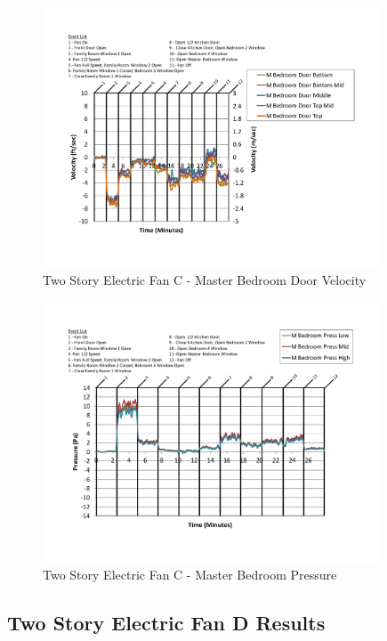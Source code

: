 \documentclass{article}
\begin{document}
\begin{appendices}
	\begin{figure}[H]
		\centering
		\includegraphics[height=3.05in,trim=0.67in 1.1in 0.67in 0.8in,clip=true]{0_Images/Results_Charts/ColdFlow/Two_Story/Electric/C/Master_Bedroom_Door_Velocity.pdf}
		\caption{Two Story Electric Fan C - Master Bedroom Door Velocity}
	\end{figure}
 

	\begin{figure}[H]
		\centering
		\includegraphics[height=3.05in,trim=0.67in 1.1in 0.67in 0.8in,clip=true]{0_Images/Results_Charts/ColdFlow/Two_Story/Electric/C/Master_Bedroom_Pressure.pdf}
		\caption{Two Story Electric Fan C - Master Bedroom Pressure}
	\end{figure}
 
	\clearpage

		\clearpage
\clearpage		\large
\subsection{Two Story Electric Fan D Results} \label{App:Two_StoryElectricFanDResults} 


\end{appendices}
\end{document}
